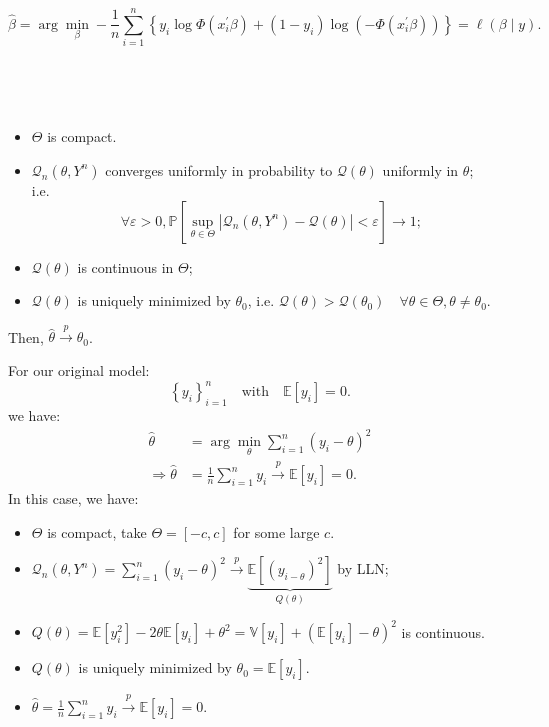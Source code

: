 \begin{eg}
    \[
    \hat{\beta} = \arg \min_{\beta} -\frac{1}{n} \sum_{i=1}^{n} \left\{y_i \log \Phi\left(x_i^{\prime} \beta\right) + (1-y_i) \log \left(-\Phi\left(x_i^{\prime} \beta\right)\right)\right\} = \ell(\beta \mid y).
    \]
\end{eg}

\begin{proposition} \label{prop:consistency}
    \ 
    
    \begin{assumption}
        \

        \begin{itemize}
            \item $\Theta$ is compact.
            \item $\mathcal{Q}_n(\theta, Y^n)$ converges uniformly in probability to $\mathcal{Q}(\theta)$ uniformly in $\theta$;\\
            i.e. \[
            \forall \varepsilon > 0, \mathbb{P}\left[\sup_{\theta \in \Theta} \left| \mathcal{Q}_n(\theta, Y^n) - \mathcal{Q}(\theta) \right| < \varepsilon\right] \to 1;
            \]
            \item $\mathcal{Q}(\theta)$ is continuous in $\Theta$;
            \item $\mathcal{Q}(\theta)$ is uniquely minimized by $\theta_0$, i.e. $\mathcal{Q}(\theta) > \mathcal{Q}(\theta_0) \quad \forall \theta \in \Theta, \theta \neq \theta_0.$
        \end{itemize}
    \end{assumption}   
    Then, $\hat{\theta} \overset{p}{\rightarrow} \theta_0$.
\end{proposition}

For our original model:
\[
\left\{ y_i \right\}_{i=1}^{n} \quad \text{with} \quad \mathbb{E}[y_i]=0.
\]
we have:
\begin{align*}
    \hat{\theta} &= \arg \min_{\theta} \sum_{i=1}^{n} \left(y_{i}-\theta \right)^2 \\
    \Rightarrow \hat{\theta} &= \frac{1}{n} \sum_{i=1}^{n} y_i \overset{p}{\rightarrow} \mathbb{E}[y_i] = 0.
\end{align*}
In this case, we have:
\begin{itemize}
    \item $\Theta$ is compact, take $\Theta = [-c, c]$ for some large $c$.
    \item $\mathcal{Q}_n(\theta, Y^n) = \sum_{i=1}^{n} \left(y_i - \theta\right)^2 \overset{p}{\rightarrow} \underset{Q (\theta)}{\underbrace{\mathbb{E}\left[(y_{i-\theta})^2\right]}}$ by LLN;
    \item $Q (\theta) = \mathbb{E}[y_i^2] - 2 \theta \mathbb{E}[y_i] + \theta^2 = \mathbb{V}[y_i] + \left( \mathbb{E}[y_i]-\theta \right)^2$ is continuous.
    \item $Q (\theta)$ is uniquely minimized by $\theta_0 = \mathbb{E}[y_i]$.
    \item $\hat{\theta} = \frac{1}{n} \sum_{i=1}^{n} y_i \overset{p}{\rightarrow} \mathbb{E}[y_i] = 0$.
\end{itemize}

